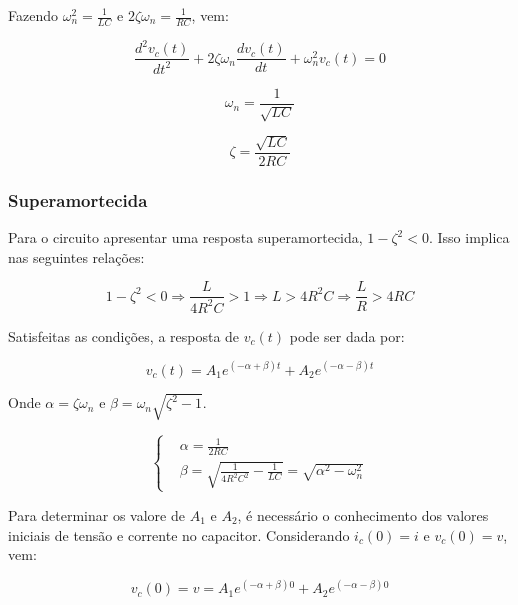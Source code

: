 \documentclass[12pt,fleqn]{book} %
\begin{document}
{Fazendo $\omega_n^2 = \frac{1}{LC}$ e $2\zeta\omega_n = \frac{1}{RC}$, vem:

\begin{equation}
\frac{d^2v_c(t)}{dt^2} + 2\zeta\omega_n\frac{dv_c(t)}{dt} + \omega_n^2v_c(t) = 0
\end{equation}

\begin{equation}
\omega_n = \frac{1}{\sqrt{LC}}
\end{equation}

\begin{equation}
\zeta = \frac{\sqrt{LC}}{2RC}
\end{equation}

        
            \subsubsection{Superamortecida}

Para o circuito apresentar uma resposta superamortecida, $1-\zeta^2 < 0$. Isso implica nas seguintes relações:

\begin{equation}
1-\zeta^2 < 0 \Rightarrow \frac{L}{4R^2C} > 1 \Rightarrow L > 4R^2C \Rightarrow \frac{L}{R} > 4RC
\end{equation}

Satisfeitas as condições, a resposta de $v_c(t)$ pode ser dada por:

\begin{equation}
v_c(t) = A_1e^{(-\alpha + \beta)t} + A_2e^{(-\alpha - \beta)t}
\end{equation}

Onde $\alpha = \zeta\omega_n$ e $\beta = \omega_n\sqrt{\zeta^2-1}$.

\begin{equation}
\left\{\begin{aligned} & 
        \alpha = \frac{1}{2RC}\\&         
        \beta = \sqrt{\frac{1}{4R^2C^2}-\frac{1}{LC}} = \sqrt{\alpha^2-\omega_n^2}
    \end{aligned}\right.
\end{equation}

Para determinar os valore de $A_1$ e $A_2$, é necessário o conhecimento dos valores iniciais de tensão e corrente no capacitor. Considerando $i_c(0) = i$ e $v_c(0) = v$, vem:

\begin{equation}
v_c(0) = v = A_1e^{(-\alpha + \beta)0} + A_2e^{(-\alpha - \beta)0}
\end{equation}

}
\end{document}
